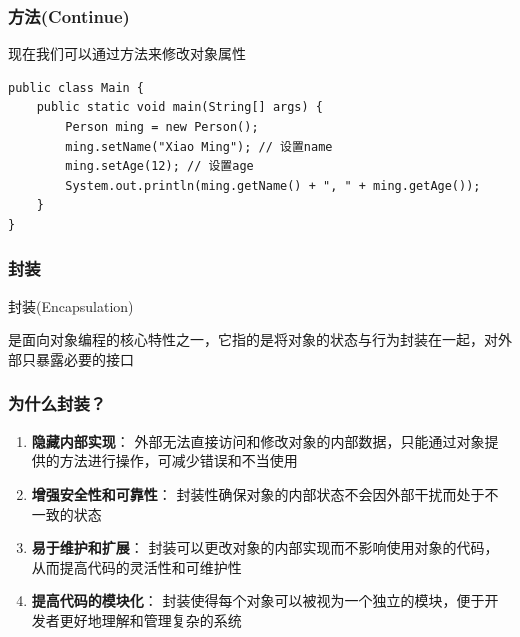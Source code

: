 \documentclass[UTF8, 16pt]{beamer}
\begin{document}
\begin{frame}[fragile]
    \frametitle{方法(Continue)}
    \textcolor{sufered}{现在我们可以通过方法来修改对象属性}
    \begin{lstlisting}
public class Main {
    public static void main(String[] args) {
        Person ming = new Person();
        ming.setName("Xiao Ming"); // 设置name
        ming.setAge(12); // 设置age
        System.out.println(ming.getName() + ", " + ming.getAge());
    }
}
    \end{lstlisting}
\end{frame}

\begin{frame}
    \frametitle{封装}
    \textcolor{sufered}{封装(Encapsulation)}

    是面向对象编程的核心特性之一，它指的是将对象的状态与行为封装在一起，对外部只暴露必要的接口
\end{frame}

\begin{frame}
    \frametitle{为什么封装？}

    \begin{enumerate}
        \item \textbf{隐藏内部实现}：
              外部无法直接访问和修改对象的内部数据，只能通过对象提供的方法进行操作，可减少错误和不当使用

        \item \textbf{增强安全性和可靠性}：
              封装性确保对象的内部状态不会因外部干扰而处于不一致的状态

        \item \textbf{易于维护和扩展}：
              封装可以更改对象的内部实现而不影响使用对象的代码，从而提高代码的灵活性和可维护性

        \item \textbf{提高代码的模块化}：
              封装使得每个对象可以被视为一个独立的模块，便于开发者更好地理解和管理复杂的系统
    \end{enumerate}
\end{frame}


\end{document}

